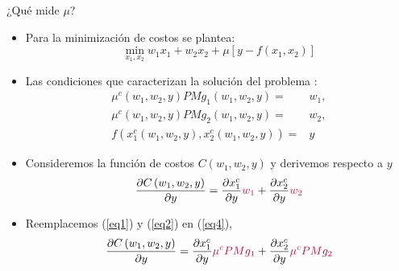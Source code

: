 \documentclass{beamer}
\theoremstyle{definition}
\begin{document}
\begin{frame}{¿Qué mide $\mu$?}\small
\begin{itemize}
\item Para la minimización de costos se plantea: \[\displaystyle\min_{x_1,x_2} w_1x_1+w_2x_2+\mu[y-f(x_1,x_2)]\]
\item Las condiciones que caracterizan la soluci\'{o}n del problema :
\begin{align}
\mu ^{c}\left( w_{1},w_{2},y\right) PMg_{1}\left( w_{1},w_{2},y\right)
=&w_{1},\label{eq1} \\
\mu ^{c}\left( w_{1},w_{2},y\right) PMg_{2}\left( w_{1},w_{2},y\right)
=&w_{2}, \label{eq2}\\
f\left( x_{1}^{c}\left( w_{1},w_{2},y\right) ,x_{2}^{c}\left(
w_{1},w_{2},y\right) \right) =&y \label{eq3}
\end{align}

\item Consideremos la función de costos $C(w_1,w_2,y)$ y derivemos respecto a $y$
\begin{equation}
\frac{\partial C\left( w_{1},w_{2},y\right) }{\partial y}=\frac{\partial
x_{1}^{c}}{\partial y}\color{rosee}w_{1}\color{black}+\frac{\partial x_{2}^{c}}{\partial y}\color{rosee}w_{2}\color{black} \label{eq4}
\end{equation}
\item Reemplacemos (\ref{eq1}) y (\ref{eq2}) en (\ref{eq4}),
\begin{equation}
\frac{\partial C\left( w_{1},w_{2},y\right) }{\partial y}=\frac{\partial x_{1}^{c}}{\partial y}\color{rosee}\mu ^{c}PMg_{1}\color{black}+\frac{\partial x_{2}^{c}}{\partial y}\color{rosee}\mu ^{c}PMg_{2}\color{black} \label{eq5}
\end{equation}
\end{itemize}
\end{frame}
\end{document}
